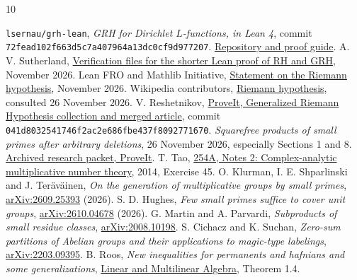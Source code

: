 \documentclass[11pt]{article}
\begin{document}
\begin{thebibliography}{10}\small\raggedright\setlength{\itemsep}{1pt}\setlength{\parsep}{0pt}
 \texttt{lsernau/grh-lean}, \emph{GRH for Dirichlet $L$-functions, in Lean 4}, commit \texttt{72fead102f663d5c7a407964a13dc0cf9d977207}.
\href{https://github.com/lsernau/grh-lean/tree/72fead102f663d5c7a407964a13dc0cf9d977207}{Repository and proof guide}.
 A. V. Sutherland, \href{https://math.mit.edu/~drew/shortgrh/}{Verification files for the shorter Lean proof of RH and GRH}, November 2026.
 Lean FRO and Mathlib Initiative, \href{https://leanprover-community.github.io/blog/posts/riemann-hypothesis/}{Statement on the Riemann hypothesis}, November 2026.
 Wikipedia contributors, \href{https://en.wikipedia.org/wiki/Riemann_hypothesis}{Riemann hypothesis}, consulted 26 November 2026.
 V. Reshetnikov, \href{https://github.com/VladimirReshetnikov/ProveIt/tree/041d8032541746f2ac2e686fbe437f8092771670/Analysis/GeneralizedRiemannHypothesis}{ProveIt, Generalized Riemann Hypothesis collection and merged article}, commit \texttt{041d8032541746f2ac2e686fbe437f8092771670}.
 \emph{Squarefree products of small primes after arbitrary deletions}, 26 November 2026, especially Sections 1 and 8. \href{https://github.com/VladimirReshetnikov/ProveIt/blob/041d8032541746f2ac2e686fbe437f8092771670/Analysis/GeneralizedRiemannHypothesis/docs/incoming/squarefree_prime_products.zip}{Archived research packet, ProveIt}.
 T. Tao, \href{https://terrytao.wordpress.com/2014/12/09/254a-notes-2-complex-analytic-multiplicative-number-theory/}{254A, Notes 2: Complex-analytic multiplicative number theory}, 2014, Exercise 45.
 O. Klurman, I. E. Shparlinski and J. Ter\"av\"ainen, \emph{On the generation of multiplicative groups by small primes}, \href{https://arxiv.org/abs/2609.25393}{arXiv:2609.25393} (2026).
 S. D. Hughes, \emph{Few small primes suffice to cover unit groups}, \href{https://arxiv.org/abs/2610.04678}{arXiv:2610.04678} (2026).
 G. Martin and A. Parvardi, \emph{Subproducts of small residue classes}, \href{https://arxiv.org/abs/2008.10198}{arXiv:2008.10198}.
 S. Cichacz and K. Suchan, \emph{Zero-sum partitions of Abelian groups and their applications to magic-type labelings}, \href{https://arxiv.org/abs/2203.09395}{arXiv:2203.09395}.
 B. Roos, \emph{New inequalities for permanents and hafnians and some generalizations}, \href{https://doi.org/10.1080/03081087.2024.2436061}{Linear and Multilinear Algebra}, Theorem 1.4.
\end{thebibliography}
\end{document}
